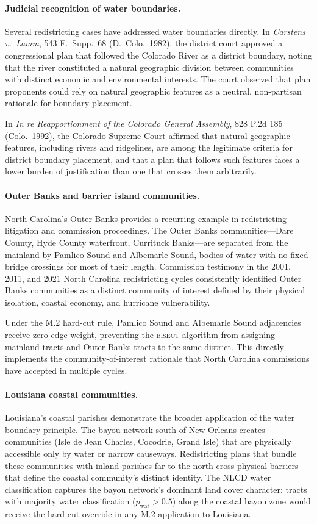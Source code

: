\paragraph{Judicial recognition of water boundaries.}
Several redistricting cases have addressed water boundaries directly.
In \textit{Carstens v.\ Lamm}, 543 F.\ Supp.\ 68 (D.\ Colo.\ 1982),
the district court approved a congressional plan that followed the
Colorado River as a district boundary, noting that the river constituted
a natural geographic division between communities with distinct economic
and environmental interests.
The court observed that plan proponents could rely on natural geographic
features as a neutral, non-partisan rationale for boundary placement.

In \textit{In re Reapportionment of the Colorado General Assembly},
828 P.2d 185 (Colo.\ 1992), the Colorado Supreme Court affirmed that
natural geographic features, including rivers and ridgelines, are among
the legitimate criteria for district boundary placement, and that a plan
that follows such features faces a lower burden of justification than
one that crosses them arbitrarily.

\paragraph{Outer Banks and barrier island communities.}
North Carolina's Outer Banks provides a recurring example in redistricting
litigation and commission proceedings.
The Outer Banks communities---Dare County, Hyde County waterfront, Currituck
Banks---are separated from the mainland by Pamlico Sound and Albemarle Sound,
bodies of water with no fixed bridge crossings for most of their length.
Commission testimony in the 2001, 2011, and 2021 North Carolina redistricting
cycles consistently identified Outer Banks communities as a distinct community
of interest defined by their physical isolation, coastal economy, and
hurricane vulnerability.

Under the M.2 hard-cut rule, Pamlico Sound and Albemarle Sound adjacencies
receive zero edge weight, preventing the \textsc{bisect} algorithm from
assigning mainland tracts and Outer Banks tracts to the same district.
This directly implements the community-of-interest rationale that North
Carolina commissions have accepted in multiple cycles.

\paragraph{Louisiana coastal communities.}
Louisiana's coastal parishes demonstrate the broader application of the
water boundary principle.
The bayou network south of New Orleans creates communities (Isle de Jean
Charles, Cocodrie, Grand Isle) that are physically accessible only by water
or narrow causeways.
Redistricting plans that bundle these communities with inland parishes far
to the north cross physical barriers that define the coastal community's
distinct identity.
The NLCD water classification captures the bayou network's dominant land
cover character: tracts with majority water classification ($p_{\mathrm{wat}} > 0.5$)
along the coastal bayou zone would receive the hard-cut override in any
M.2 application to Louisiana.


